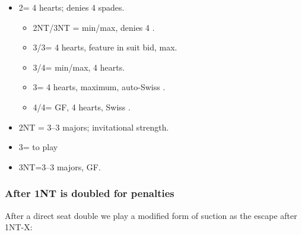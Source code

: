 \documentclass[a4paper,14pt]{extarticle}
\begin{document}
\begin{itemize}
\begin{itemize}
		\item 2\spades = 4 hearts; denies 4 spades.
			\begin{itemize}
			\item 2NT/3NT = min/max, denies 4 \hearts.
			\item 3\clubs/3\diamonds = 4 hearts, feature in suit bid, max.
			\item 3\hearts/4\hearts = min/max, 4 hearts.
			\item 3\spades = 4 hearts, maximum, auto-Swiss .
			\item 4\clubs/4\diamonds = GF, 4 hearts, Swiss .
			\end{itemize}

		\item 2NT = 3--3 majors; invitational strength.
		\item 3\clubs = to play
		\item 3NT=3--3 majors, GF.
		\end{itemize}
	\end{itemize}

\newpage

\subsubsection{After 1NT is doubled for penalties}
\label{sec:resp:1nx}
\label{note:20}

After a direct seat double we play a modified form of suction as the escape after 1NT-X:
\end{document}

